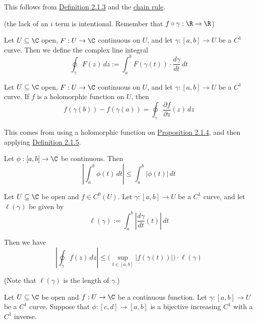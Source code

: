 This follows from \href{c511702}{Definition 2.1.3} and the \href{d969d46}{chain
rule}.

(the lack of an $i$ term is intentional. Remember that
$f\circ\gamma:\R\to\R$)

\label{b1e96fc}

Let $U\subseteq\C$ open, $F:U\to\C$ continuous on $U$, and let $\gamma:[a,b]\to
U$ be a $C^1$ curve. Then we define the complex line integral
$$
  \oint_\gamma F(z)\,dz:=\int_a^bF(\gamma(t))\cdot\frac{d\gamma}{dt}\,dt
$$

\label{c526c09}

Let $U\subseteq\C$ open, $F:U\to\C$ continuous on $U$, and let $\gamma:[a,b]\to
U$ be a $C^1$ curve. If $f$ is a holomorphic function on $U$, then
$$
  f(\gamma(b))-f(\gamma(a))=\oint_\gamma\frac{\partial f}{\partial z}(z)\,dz
$$

This comes from using a holomorphic function on \href{f37b676}{Proposition
2.1.4}, and then applying \href{b1e96fc}{Definition 2.1.5}.

\label{bcec8b1}

Let $\phi:[a,b]\to\C$ be continuous. Then
$$
  \left|\int_a^b\phi(t)\,dt\right|\leq\int_a^b|\phi(t)|\,dt
$$

\label{faf3f86}

Let $U\subseteq\C$ be open and $f\in C^0(U)$. Let $\gamma:[a,b]\to U$ be a
$C^1$ curve, and let $\ell(\gamma)$ be given by
$$
  \ell(\gamma):=\int_a^b\left|\frac{d\gamma}{dt}(t)\right|\,dt
$$

Then we have
$$
  \left|\oint_\gamma f(z)\,dz\right|\leq
  \Big(\sup_{t\in[a,b]}|f(\gamma(t))|\Big)\cdot\ell(\gamma)
$$

(Note that $\ell(\gamma)$ is the length of $\gamma$.)

\label{f74efcb}

Let $U\subseteq\C$ be open and $f:U\to\C$ be a continuous function. Let
$\gamma:[a,b]\to U$ be a $C^1$ curve. Suppose that $\phi:[c,d]\to[a,b]$ is a
bijective increasing $C^1$ with a $C^1$ inverse.


